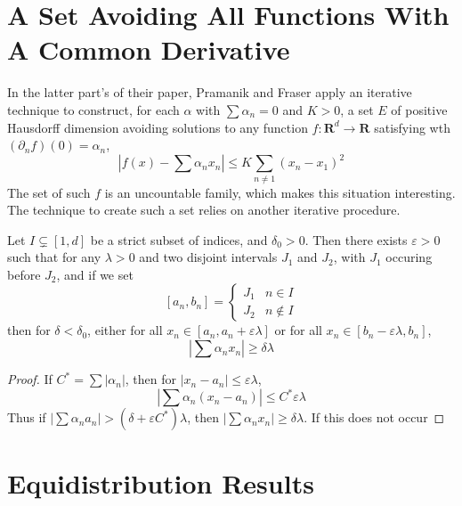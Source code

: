 \section{A Set Avoiding All Functions With A Common Derivative}

In the latter part's of their paper, Pramanik and Fraser apply an iterative technique to construct, for each $\alpha$ with $\sum \alpha_n = 0$ and $K > 0$, a set $E$ of positive Hausdorff dimension avoiding solutions to any function $f: \mathbf{R}^d \to \mathbf{R}$ satisfying wth $(\partial_n f)(0) = \alpha_n$,
%
\[ \left| f(x) - \sum \alpha_n x_n \right| \leq K \sum_{n \neq 1} (x_n - x_1)^2 \]
%
The set of such $f$ is an uncountable family, which makes this situation interesting. The technique to create such a set relies on another iterative procedure.

\begin{lemma}
    Let $I \subsetneq [1,d]$ be a strict subset of indices, and $\delta_0 > 0$. Then there exists $\varepsilon > 0$ such that for any $\lambda > 0$ and two disjoint intervals $J_1$ and $J_2$, with $J_1$ occuring before $J_2$, and if we set
    \[ [a_n,b_n] = \begin{cases} J_1 & n \in I \\ J_2 & n \not \in I \end{cases} \]
    then for $\delta < \delta_0$, either for all $x_n \in [a_n,a_n+\varepsilon \lambda]$ or for all $x_n \in [b_n - \varepsilon \lambda, b_n]$,
    \[ \left| \sum \alpha_n x_n \right| \geq \delta \lambda \]
\end{lemma}
\begin{proof}
    If $C^* = \sum |\alpha_n|$, then for $|x_n - a_n| \leq \varepsilon \lambda$,
    \[ |\sum \alpha_n (x_n - a_n)| \leq C^* \varepsilon \lambda \]
    Thus if $|\sum \alpha_n a_n| > (\delta + \varepsilon C^*)\lambda$, then $|\sum \alpha_n x_n| \geq \delta \lambda$. If this does not occur
\end{proof}









\section{Equidistribution Results}

